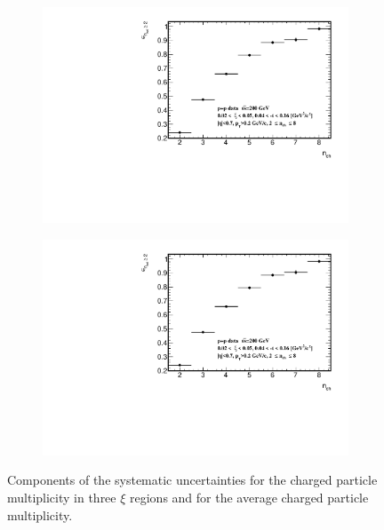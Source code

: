 \begin{figure}[h!]
\begin{subfigure}{.49\textwidth}
		\includegraphics[width=\textwidth,page=20]{chapters/chrgSTAR/img/syst/outSD.pdf}
	\end{subfigure}
	\begin{subfigure}{.49\textwidth}
		\includegraphics[width=\textwidth,page=22]{chapters/chrgSTAR/img/syst/outSD.pdf}
	\end{subfigure}
	\caption{Components of the systematic uncertainties for the charged particle multiplicity in three $\xi$ regions and for the average charged particle multiplicity. }
	\label{fig:results_star_nch_syst}
	\vspace{-1.5cm}
\end{figure}
